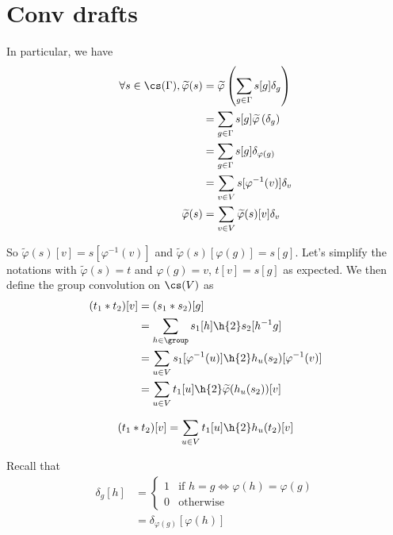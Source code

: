 \section{Conv drafts}



In particular, we have
\begin{align*}
\forall s \in \cs(\Gamma), \widetilde\varphi(s) & = \widetilde\varphi\left( \displaystyle \sum_{g \in \Gamma} s[g] \delta_g \right)\\
& = \displaystyle \sum_{g \in \Gamma} s[g] \widetilde\varphi\left(\delta_g \right)\\
& = \displaystyle \sum_{g \in \Gamma} s[g] \delta_{\varphi(g)}\\
& = \displaystyle \sum_{v \in V} s[\varphi^{-1}(v)] \delta_{v}\\
\widetilde\varphi(s) & = \displaystyle \sum_{v \in V} \widetilde\varphi(s)[v] \delta_v\\
\end{align*}

So $\widetilde\varphi(s)[v] = s[\varphi^{-1}(v)]$ and $\widetilde\varphi(s)[\varphi(g)] = s[g]$. Let's simplify the notations with $\widetilde\varphi(s) = t$ and $\varphi(g) = v$, \ie $t[v] = s[g]$ as expected. We then define the group convolution on $\cs(V)$ as
\begin{align*}
(t_1 \ast t_2)[v] & = (s_1 \ast s_2)[g]\\
& = \displaystyle \sum_{h \in \group} s_1[h] \h{2} s_2[h^{-1}g]\\
& = \displaystyle \sum_{u \in V} s_1[\varphi^{-1}(u)] \h{2} h_u(s_2)[\varphi^{-1}(v)]\\
& = \displaystyle \sum_{u \in V} t_1[u] \h{2} \widetilde\varphi(h_u(s_2))[v]\\
\end{align*}



\begin{gather}
(t_1 \ast t_2)[v] = \displaystyle \sum_{u \in V} t_1[u] \h{2} h_u(t_2)[v]\\
\end{gather}






Recall that
\begin{align*}
\delta_{g}[h] & = \begin{cases} 1 & \text{if } h = g \Leftrightarrow \varphi(h) = \varphi(g)\\ 0 & \text{otherwise} \end{cases}\\
              & = \delta_{\varphi(g)}[\varphi(h)]
\end{align*}

